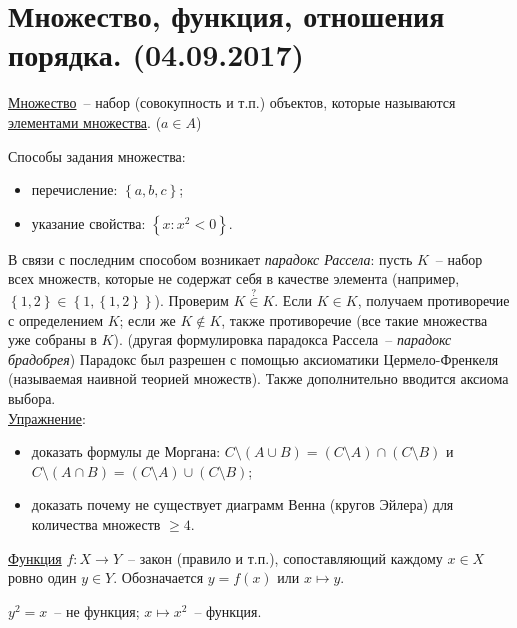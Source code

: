 \section{Множество, функция, отношения порядка. (04.09.2017)}

\begin{defin}
	\underline{Множество}~-- набор (совокупность и т.п.) объектов, которые называются \underline{элементами множества}. ($a \in A$)
\end{defin} 

Способы задания множества:
\begin{itemize}
  \item перечисление: $\left\{ a, b, c \right\}$;
  \item указание свойства: $\left\{ x: x^2 < 0 \right\}$.
\end{itemize}

\label{russel_paradox}
В связи с последним способом возникает \textit{парадокс Рассела}: пусть $K$~-- набор всех множеств, которые не содержат себя в качестве элемента (например, $\left\{ 1,2 \right\} \in \left\{ 1, \left\{ 1, 2 \right\} \right\}$). Проверим $K \overset{?}{\in} K$. Если $K \in K$, получаем противоречие с определением $K$; если же $K \not\in K$, также противоречие (все такие множества уже собраны в $K$). (другая формулировка парадокса Рассела~-- \textit{парадокс брадобрея}) Парадокс был разрешен с помощью аксиоматики Цермело-Френкеля (называемая наивной теорией множеств). Также дополнительно вводится аксиома выбора.\\

\underline{Упражнение}:
\begin{itemize}
	\item доказать формулы де Моргана: $C \setminus (A \cup B) = (C \setminus A) \cap (C \setminus B)$ и $C \setminus (A \cap B) = (C \setminus A) \cup (C \setminus B)$;
	\item доказать почему не существует диаграмм Венна (кругов Эйлера) для количества множеств $\ge 4$.\\
\end{itemize}

\begin{defin}
	\underline{Функция} $f: X \to Y$~-- закон (правило и т.п.), сопоставляющий каждому $x \in X$ ровно один $y \in Y$. Обозначается $y=f(x)$ или $x \mapsto y$.
\end{defin}

\begin{ex}
	$y^2 = x$~-- не функция; $x \mapsto x^2$~-- функция.
\end{ex}

